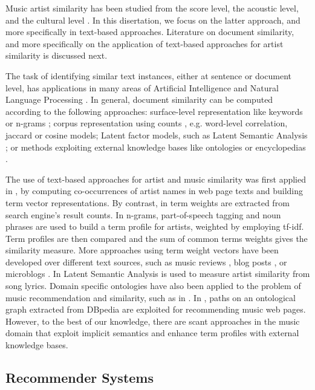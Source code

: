 Music artist similarity has been studied from the score level, the acoustic level, and the cultural level \citep{Ellis2002}. In this disertation, we focus on the latter approach, and more specifically in text-based approaches. Literature on document similarity, and more specifically on the application of text-based approaches for artist similarity is discussed next.

The task of identifying similar text instances, either at sentence or document level, has applications in many areas of Artificial Intelligence and Natural Language Processing \citep{LiuandWang2014}. In general, document similarity can be computed according to the following approaches: surface-level representation like keywords or n-grams \citep{ChimandDeng2008}; corpus representation using counts \citep{Rorvig1999}, e.g. word-level correlation, jaccard or cosine models; Latent factor models, such as Latent Semantic Analysis \citep{Deerwesteretal1990}; or methods exploiting external knowledge bases like ontologies or encyclopedias \citep{Huetal2009}.

The use of text-based approaches for artist and music similarity was first applied in \citep{Cohen2000}, by computing co-occurrences of artist names in web page texts and building term vector representations. By contrast, in \citep{Schedl2005} term weights are extracted from search engine's result counts. In \citep{Whitman2002} n-grams, part-of-speech tagging and noun phrases are used to build a term profile for artists, weighted by employing tf-idf. Term profiles are then compared and the sum of common terms weights gives the similarity measure. %
More approaches using term weight vectors have been developed over different text sources, such as music reviews \citep{Hu2005}, blog posts \citep{Celma2006}, or microblogs \citep{Schedl2013}.
In \citep{Logan2003} Latent Semantic Analysis is used to measure artist similarity from song lyrics. Domain specific ontologies have also been applied to the problem of music recommendation and similarity, such as in \citep{Celma2008}. In \citep{Leal2012}, paths on an ontological graph extracted from DBpedia are exploited for recommending music web pages. However, to the best of our knowledge, there are scant approaches in the music domain that exploit implicit semantics and enhance term profiles with external knowledge bases.


\subsection{Recommender Systems}
\label{sec:SOA:mir:recommendation}

